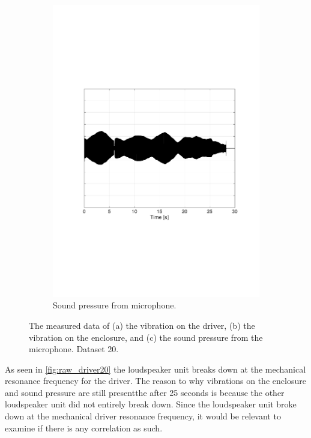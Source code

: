 \begin{figure}[H]
\begin{subfigure}[t]{0.3\textwidth}
	\includegraphics[width=1\textwidth]{figures/raw_microphone20.pdf}
	\caption{Sound pressure from microphone.}
	\label{fig:raw_microphone20}
\end{subfigure}
\caption{The measured data of (a) the vibration on the driver, (b) the vibration on the enclosure, and (c) the sound pressure from the microphone. Dataset 20.}
\label{fig:raw20}
\end{figure} 

As seen in \autoref{fig:raw_driver20} the loudspeaker unit breaks down at the mechanical resonance frequency for the driver. The reason to why vibrations on the enclosure and sound pressure are still presentthe  after 25 seconds is because the other loudspeaker unit did not entirely break down. Since the loudspeaker unit broke down at the mechanical driver resonance frequency, it would be relevant to examine if there is any correlation as such.




